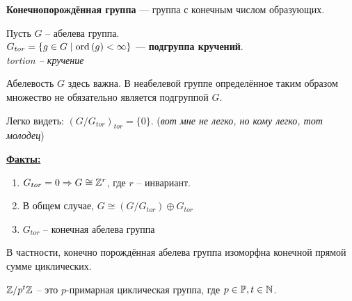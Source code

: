 \begin{conj}
    \textbf{Конечнопорождённая группа} --- группа с 
    конечным числом образующих.
\end{conj}
\begin{conj} $ $\\
    Пусть $G$ -- абелева группа.\\
    $G_{tor} = \{ g \in G \mid \operatorname{ord}\left( g \right) < \infty \}$
    --- \textbf{подгруппа кручений}.\\
    \textit{tortion -- кручение}
\end{conj}
\notice Абелевость $G$ здесь важна. В неабелевой группе
определённое таким образом множество не обязательно является
подгруппой $G$.

Легко видеть: $(G/G_{tor})_{tor} = \{ 0 \}$. 
(\textit{вот мне не легко, но кому легко, тот молодец})

\underline{\textbf{Факты:}}
\begin{enumerate}
    \item $G_{tor} = 0 \Rightarrow G \cong \mathbb{Z}^r$, 
    где $r$ -- инвариант.
    \item В общем случае, $G \cong (G / G_{tor}) \oplus G_{tor}$
    \item $G_{tor}$ -- конечная абелева группа
\end{enumerate}
\notice В частности, конечно порождённая абелева группа изоморфна
конечной прямой сумме циклических.

\begin{conj}
    $\mathbb{Z}/p^t\mathbb{Z}$ -- это $p$-примарная циклическая группа,
    где $p \in \mathbb{P}, t \in \mathbb{N}$.
\end{conj}

